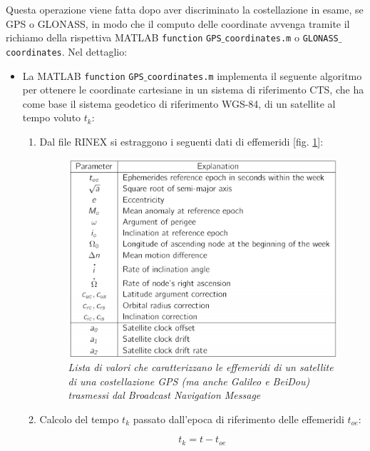 \documentclass[a4paper,11pt,twoside]{book}
\begin{document}
	Questa operazione viene fatta dopo aver discriminato la costellazione in esame, se GPS o GLONASS, in modo che il computo delle coordinate avvenga tramite il richiamo della rispettiva MATLAB \texttt{function} \texttt{GPS$\_$coordinates.m} o \texttt{GLONASS$\_$coordinates}. Nel dettaglio:
	
	\begin{itemize}[-]
		\item La MATLAB \texttt{function} \texttt{GPS$\_$coordinates.m} implementa il seguente algoritmo per ottenere le coordinate cartesiane in un sistema di riferimento CTS, che ha come base il sistema geodetico di riferimento WGS-84, di un satellite al tempo voluto $t_k$:
		
		\begin{enumerate}
			\item Dal file RINEX si estraggono i seguenti dati di effemeridi [fig. \ref{fig:efembrd}]:
			
			\begin{figure}[H]
				\centering
				\includegraphics[scale=0.47]{"Immagini workbook/Immagini esp2/efembrd"}
				\caption{\textit{Lista di valori che caratterizzano le effemeridi di un satellite di una costellazione GPS (ma anche Galileo e BeiDou) trasmessi dal Broadcast Navigation Message}}
				\label{fig:efembrd}
			\end{figure}
		
			\item Calcolo del tempo $t_k$ passato dall'epoca di riferimento delle effemeridi $t_{oe}$:
			
			\begin{equation}
				t_k = t - t_{oe}
			\end{equation}
		

\end{enumerate}
\end{itemize}
\end{document}

